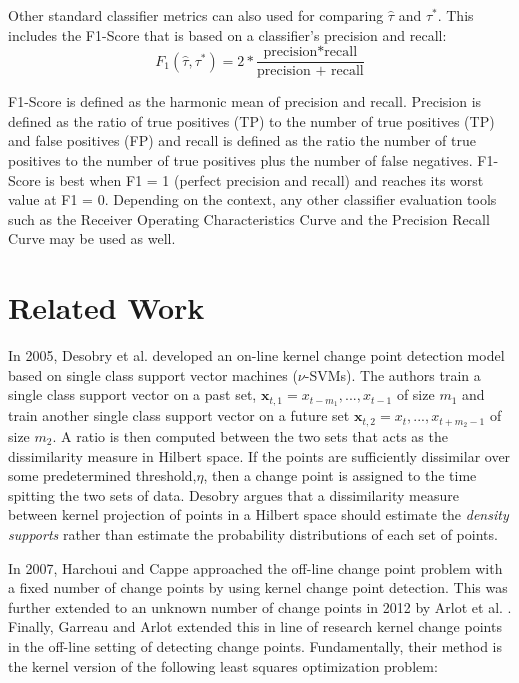 Other standard classifier metrics can also used for comparing $\hat{\tau}$ and $\tau^*$. This includes the  F1-Score that is based on a classifier's precision and recall:
\begin{equation}
F_1(\hat{\tau}, \tau^*) = 2 * \frac{\text{precision*recall}}{\text{precision + recall}}
\end{equation}

 F1-Score is defined as the harmonic mean of precision and recall. Precision is defined as the ratio of true positives (TP) to the
number of true positives (TP) and false positives (FP) and recall is defined as the ratio the number of true positives to the
number of true positives plus the number of false negatives. F1-Score is best when F1 = 1 (perfect precision and recall) and reaches its worst value at F1 = 0. Depending on the context, any other classifier evaluation tools such as the Receiver Operating Characteristics Curve and the Precision Recall Curve may be used as well.

\section{Related Work}

In 2005, Desobry et al. \cite{desobry2005online} developed an on-line kernel change point detection model based on single class support vector machines ($\nu$-SVMs). The authors train a single class support vector on a past set, $\mathbf{x}_{t,1}={x_{t-m_1},...,x_{t-1}}$ of size $m_1$ and train another single class support vector on a future set $\mathbf{x}_{t,2}={x_t,...,x_{t+m_2-1}}$ of size $m_2$. A ratio is then computed between the two sets that acts as the dissimilarity measure in Hilbert space. If the points are sufficiently dissimilar over some predetermined threshold,$\eta$, then a change point is assigned to the time spitting the two sets of data. Desobry argues that a dissimilarity measure between kernel projection of points in a Hilbert space should estimate the \textit{density supports} rather than estimate the probability distributions of each set of points. 

In 2007, Harchoui and Cappe \cite{harchaoui2007retrospective} approached the off-line change point problem with a fixed number of change points by using kernel change point detection. This was further extended to an unknown number of change points in 2012 by Arlot et al. \cite{arlot2012kernel}. Finally, Garreau and Arlot extended this in line of research kernel change points in the off-line setting of detecting change points. Fundamentally, their method is the kernel version of the following least squares optimization problem:

